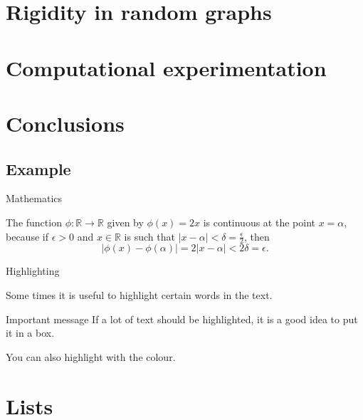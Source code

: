 \documentclass[UKenglish, aspectratio = 169]{beamer}
\begin{document}
\section{Rigidity in random graphs}
\SectionPage

\section{Computational experimentation}
\SectionPage

\section{Conclusions}
\SectionPage

\showlogo

\subsection{Example}

\begin{frame}{Mathematics}
    \begin{example}
        The function \(\phi \colon \mathbb{R} \to \mathbb{R}\) given by \(\phi(x) = 2x\) is continuous at the point \(x = \alpha\),
        because if \(\epsilon > 0\) and \(x \in \mathbb{R}\) is such that \(\lvert x - \alpha \rvert < \delta = \frac{\epsilon}{2}\),
        then
        \begin{equation*}
            \lvert \phi(x) - \phi(\alpha)\rvert = 2\lvert x - \alpha \rvert < 2\delta = \epsilon.
        \end{equation*}
    \end{example}
\end{frame}

\begin{frame}{Highlighting}

    Some times it is useful to \alert{highlight} certain words in the text.

    \begin{alertblock}{Important message}
        If a lot of text should be \alert{highlighted}, it is a good idea to put it in a box.
    \end{alertblock}

    You can also highlight with the  colour.
\end{frame}

\section{Lists}
\end{document}
